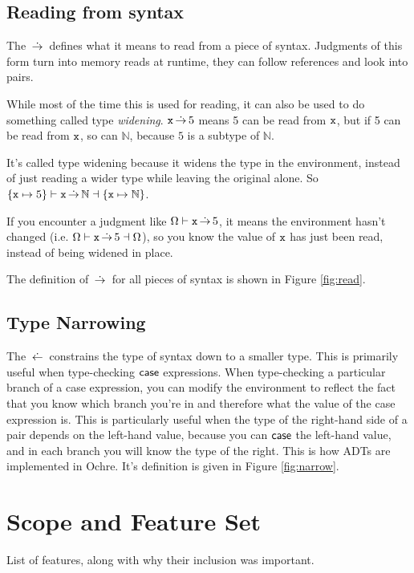 \documentclass[12pt,twoside]{report}
\begin{document}
\subsection{Reading from syntax}
The $\,\dot{\rightarrow}\,$ defines what it means to read from a piece of syntax. Judgments of this form turn into memory reads at runtime, they can follow references and look into pairs.

While most of the time this is used for reading, it can also be used to do something called type \textit{widening}. $\text{\texttt{x}} \,\dot{\rightarrow}\, 5$ means 5 can be read from $\text{\texttt{x}}$, but if 5 can be read from $\text{\texttt{x}}$, so can $\mathbb{N}$, because $5$ is a subtype of $\mathbb{N}$.

It's called type widening because it widens the type in the environment, instead of just reading a wider type while leaving the original alone. So $\{\text{\texttt{x}} \mapsto 5\} \vdash \text{\texttt{x}} \,\dot{\rightarrow}\, \mathbb{N} \dashv \{\text{\texttt{x}} \mapsto \mathbb{N}\}$.

If you encounter a judgment like $\Omega \vdash \text{\texttt{x}} \,\dot{\rightarrow}\, 5$, it means the environment hasn't changed (i.e. $\Omega \vdash \text{\texttt{x}} \,\dot{\rightarrow}\, 5 \dashv \Omega$), so you know the value of $\text{\texttt{x}}$ has just been read, instead of being widened in place.

The definition of $\,\dot{\rightarrow}\,$ for all pieces of syntax is shown in Figure \ref{fig:read}.


\subsection{Type Narrowing}
The $\,\dot{\leftarrow}\,$ constrains the type of syntax down to a smaller type. This is primarily useful when type-checking $\mathsf{case}$ expressions. When type-checking a particular branch of a case expression, you can modify the environment to reflect the fact that you know which branch you're in and therefore what the value of the case expression is. This is particularly useful when the type of the right-hand side of a pair depends on the left-hand value, because you can $\mathsf{case}$ the left-hand value, and in each branch you will know the type of the right. This is how ADTs are implemented in Ochre. It's definition is given in Figure \ref{fig:narrow}.


\section{Scope and Feature Set}
List of features, along with why their inclusion was important.
\end{document}
